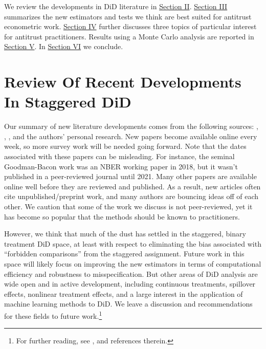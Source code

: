 \documentclass[12pt]{article}
\begin{document}
We review the developments in DiD literature in \hyperref[sec:literature]{Section II}. \hyperref[sec:analysis]{Section III} summarizes the new estimators and tests we think are best suited for antitrust econometric work. \hyperref[sec:antitrust]{Section IV} further discusses three topics of particular interest for antitrust practitioners. Results using a Monte Carlo analysis are reported in \hyperref[sec:analysis]{Section V}. In \hyperref[sec:conclusion]{Section VI} we conclude.

\section{Review Of Recent Developments In Staggered DiD} \label{sec:literature}
\begin{singlespace*}
\end{singlespace*}
\noindent Our summary of new literature developments comes from the following sources: \citet{baker2022much}, \citet{de2023two}, \citet{roth2023s}, and the authors’ personal research. New papers become available online every week, so more survey work will be needed going forward. Note that the dates associated with these papers can be misleading. For instance, the seminal Goodman-Bacon work was an NBER working paper in 2018,  but it wasn’t published in a peer-reviewed journal until 2021. Many other papers are available online well before they are reviewed and published. As a result, new articles often cite unpublished/preprint work, and many authors are bouncing ideas off of each other. We caution that some of the work we discuss is not peer-reviewed, yet it has become so popular that the methods should be known to practitioners.

However, we think that much of the dust has settled in the staggered, binary treatment DiD space, at least with respect to eliminating the bias associated with “forbidden comparisons” from the staggered assignment. Future work in this space will likely focus on improving the new estimators in terms of computational efficiency and robustness to misspecification. But other areas of DiD analysis are wide open and in active development, including continuous treatments, spillover effects, nonlinear treatment effects, and a large interest in the application of machine learning methods to DiD. We leave a discussion and recommendations for these fields to future work.\footnote{For further reading, see \citet{roth2023s}, \citet{de2023two} and references therein.}
\end{document}
